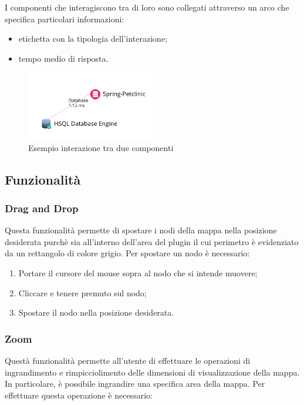 I componenti che interagiscono tra di loro sono collegati attraverso un arco che specifica  particolari informazioni:
\begin{itemize}
	\item etichetta con la tipologia dell'interazione;
	\item tempo medio di risposta.
\end{itemize}

\begin{figure}[H]
	\centering 
	\includegraphics[width=0.5\textwidth]{Images/componenti}
	\caption{Esempio interazione tra due componenti}
\end{figure}

\subsection{Funzionalità}
    \subsubsection {Drag and Drop} 
Questa funzionalità permette di spostare i nodi della mappa nella posizione desiderata purchè sia all'interno dell'area del plugin il cui perimetro è evidenziato da un rettangolo di colore grigio.
Per spostare un nodo è necessario: 
\begin{enumerate}
	
	\item Portare il cursore del mouse sopra al nodo che si intende muovere;
	\item Cliccare e tenere premuto sul nodo;
	\item Spostare il nodo nella posizione desiderata.
	
\end{enumerate}

\subsubsection{Zoom}
Questà funzionalità permette all'utente di effettuare le operazioni di ingrandimento e rimpicciolimento delle dimensioni di visualizzazione della mappa. In particolare, è possibile ingrandire una specifica area della mappa.
Per effettuare questa operazione è necessario:

